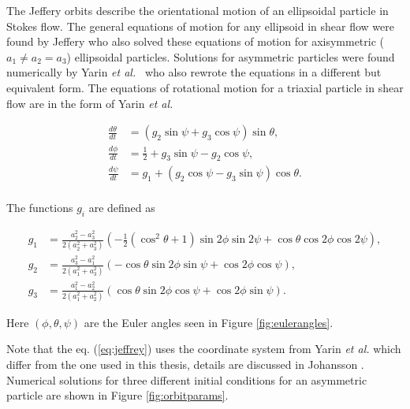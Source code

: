 \label{sec:jeffery}
The Jeffery orbits describe the orientational motion of an ellipsoidal particle in Stokes flow. The general equations of motion for any ellipsoid in shear flow were found by Jeffery\cite{Jeffery} who also solved these equations of motion for axisymmetric ($a_1 \ne a_2 = a_3$) ellipsoidal particles. Solutions for asymmetric particles were found numerically by Yarin \emph{et al.}~\cite{Yarin} who also rewrote the equations in a different but equivalent form. The equations of rotational motion for a triaxial particle in shear flow are in the form of Yarin \emph{et al.}

\begin{subequations}\label{eq:jeffrey}
\begin{align}
\frac{d\theta}{dt} 	&= (g_2 \sin \psi + g_3 \cos \psi ) \sin \theta, \\
\frac{d\phi}{dt} 	&= \tfrac{1}{2} + g_3\sin \psi - g_2 \cos \psi,\\
\frac{d\psi}{dt}	&= g_1 + (g_2\cos \psi - g_3\sin \psi) \cos \theta. \\
\end{align}
\end{subequations}

\noindent The functions  $g_i$ are defined as

\begin{subequations}
\begin{align}
g_1 &= \frac{a_2^2 - a_3^2}{2(a_2^2 + a_3^2)} 
		\left(-\tfrac{1}{2}(\cos^2 \theta + 1 )\sin 2\phi \sin 2\psi + \cos\theta \cos 2\phi \cos 2\psi \right), \\
g_2 &= \frac{a_3^2 - a_1^2}{2(a_1^2 + a_3^2)}
		\left( -\cos\theta \sin 2\phi \sin\psi  +  \cos 2\phi \cos\psi \right), \\
g_3 &= \frac{a_1^2 - a_2^2}{2(a_1^2 + a_2^2)}
		\left( \cos\theta \sin 2\phi \cos\psi + \cos 2\phi \sin\psi \right).
\end{align}
\end{subequations}

\noindent Here $(\phi, \theta, \psi)$ are the Euler angles seen in Figure \ref{fig:eulerangles}. 

Note that the eq. (\ref{eq:jeffrey}) uses the coordinate system from Yarin \emph{et al.}\cite{Yarin} which differ from the one used in this thesis, details are discussed in Johansson \cite{AntonThesis}. Numerical solutions for three different initial conditions for an asymmetric particle are shown in Figure \ref{fig:orbitparams}.

